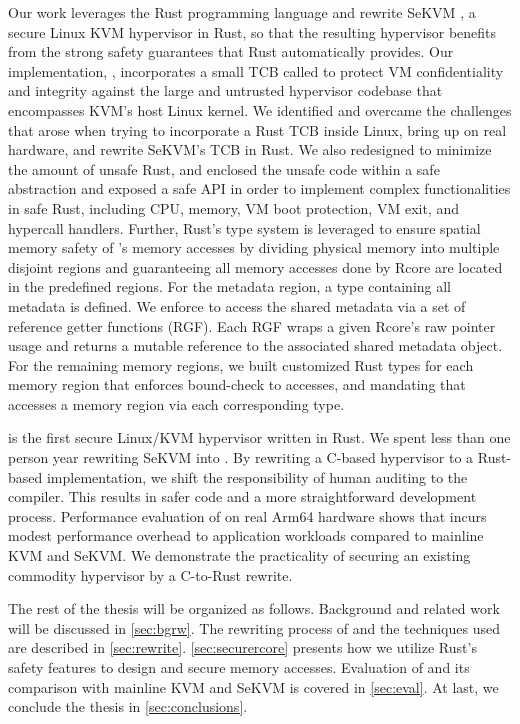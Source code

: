 Our work leverages the Rust programming language and rewrite SeKVM \cite{sekvm},
a secure Linux KVM hypervisor in Rust, so that the resulting hypervisor
benefits from the strong safety guarantees that Rust automatically provides.
Our implementation, \rustsec{}, incorporates a small TCB called \rustcore{} to
protect VM confidentiality and integrity against the large and untrusted
hypervisor codebase that encompasses KVM’s host Linux kernel.
We identified and overcame the challenges that arose when trying to
incorporate a Rust TCB inside Linux, bring up \rustsec{} on real hardware, and
rewrite SeKVM's TCB in Rust.
We also redesigned \rustcore{} to minimize the amount of unsafe Rust,
and enclosed the unsafe code within a safe abstraction and exposed a safe API
in order to implement complex functionalities in safe Rust, including CPU,
memory, VM boot protection, VM exit, and hypercall handlers.
Further, Rust’s type system is leveraged to ensure spatial memory safety of
\rustcore{}’s memory accesses by dividing physical memory into multiple
disjoint regions and guaranteeing all memory accesses done by Rcore are located
in the predefined regions.
For the \rustcore{} metadata region, a type containing all metadata is defined.
We enforce \rustcore{} to access the shared metadata via a set of reference
getter functions (RGF).
Each RGF wraps a given Rcore’s raw pointer usage and returns a mutable
reference to the associated shared metadata object.
For the remaining memory regions, we built
customized Rust types for each memory region that
enforces bound-check to accesses, and mandating that \rustcore{} accesses a
memory region via each corresponding type.

\rustsec{} is the first secure Linux/KVM hypervisor written in Rust.
We spent less than one person year rewriting SeKVM into \rustsec{}.
By rewriting a C-based hypervisor to a Rust-based implementation,
we shift the responsibility of human auditing to the compiler.
This results in safer code and a more straightforward development process.
Performance evaluation of \rustsec{} on real Arm64 hardware shows that
\rustsec{} incurs modest performance overhead to application workloads
compared to mainline KVM and SeKVM. We demonstrate the practicality of
securing an existing commodity hypervisor by a C-to-Rust rewrite.

The rest of the thesis will be organized as follows. Background and related work
will be discussed in \autoref{sec:bgrw}. The rewriting process of \rustsec{}
and the techniques used are described in \autoref{sec:rewrite}.
\autoref{sec:securercore} presents how we utilize Rust's safety features to
design and secure \rustcore{} memory accesses.
Evaluation of \rustsec{} and its comparison with mainline KVM and SeKVM is
covered in \autoref{sec:eval}. At last, we conclude the thesis in
\autoref{sec:conclusions}.
